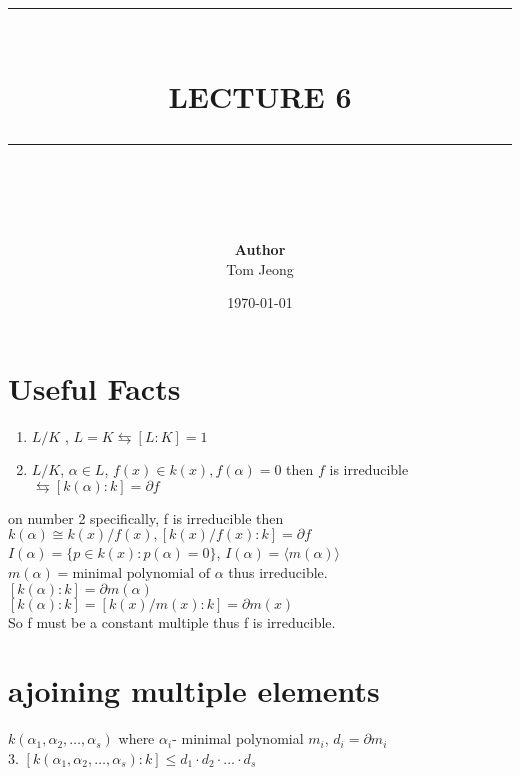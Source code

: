 \documentclass{article}
\newcommand{\HRule}[1]{\rule{\linewidth}{#1}}
\begin{document}

\title{ \normalsize \textsc{}
		\\ [2.0cm]
		\HRule{1.5pt} \\
		\LARGE \textbf{\uppercase{Lecture 6}}
		\HRule{2.0pt} \\ [0.6cm] \LARGE{}
		}

\date{\today}
\author{\textbf{Author} \\ 
		Tom Jeong
        }

\maketitle

\tableofcontents
\newpage

\section{Useful Facts}
\begin{enumerate}
    \item $L/K$ , $L = K \leftrightarrows [L:K] = 1$
    \item $L/K$, $\alpha \in L$, $f(x) \in k(x), f(\alpha) = 0$ then $f$ is irreducible $\leftrightarrows [k(\alpha):k] = \partial f$
\end{enumerate}
on number 2 specifically, f is irreducible then $k(\alpha) \cong k(x)/ f(x), [k(x) / f(x) : k] = \partial f$ \\ 
$I(\alpha) = \{p \in k(x): p (\alpha) = 0\}$, $I(\alpha) = \langle m(\alpha) \rangle$ \\ 


$m(\alpha) = \text{minimal polynomial of } \alpha$  thus irreducible.  
\\ 
$[k(\alpha):k] = \partial m(\alpha)$ \\
$[k(\alpha):k] = [k(x)/m(x):k] = \partial m(x)$ \\
So f must be a constant multiple thus f is irreducible. 

\section{ajoining multiple elements}
$k(\alpha_1, \alpha_2, \ldots, \alpha_s)$ where $\alpha_i$- minimal polynomial $m_i$, $d_i = \partial m_i$ \\
3. $[k(\alpha_1, \alpha_2, \ldots, \alpha_s):k] \leq d_1 \cdot d_2 \cdot \ldots \cdot d_s$ \\
\end{document}
